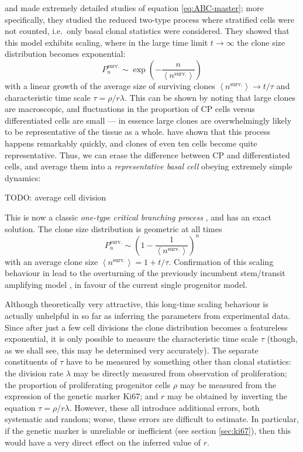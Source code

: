 \documentclass[10pt,english]{report}
\begin{document}
\citet{klein08} and \citet{tediousharvard} made extremely detailed studies of equation \eqref{eq:ABC-master}; more specifically, they studied the reduced two-type process where stratified cells were not counted, i.e.\ only basal clonal statistics were considered. They showed that this model exhibits scaling, where in the large time limit $t\rightarrow\infty$ the clone size distribution becomes exponential: $$P^\textrm{surv.}_n \sim \exp\left(-\frac{n}{\left\langle n^\textrm{surv.} \right\rangle}\right)$$ with a linear growth of the average size of surviving clones $\left\langle n^\textrm{surv.} \right\rangle \rightarrow t/\tau$ and characteristic time scale $\tau = \rho/r\lambda$. This can be shown by noting that large clones are macroscopic, and fluctuations in the proportion of CP cells versus differentiated cells are small --- in essence large clones are overwhelmingly likely to be representative of the tissue as a whole. \citealt{tediousharvard} have shown that this process happens remarkably quickly, and clones of even ten cells become quite representative. Thus, we can erase the difference between CP and differentiated cells, and average them into a \emph{representative basal cell} obeying extremely simple dynamics: 

TODO: average cell division

This is now a classic \emph{one-type critical branching process} \citep{athreya&ney}, and has an exact solution. The clone size distribution is geometric at all times $$P^\textrm{surv.}_n \sim \left(1-\frac{1}{\left\langle n^\textrm{surv.} \right\rangle}\right)^n$$ with an average clone size $\left\langle n^\textrm{surv.} \right\rangle = 1 + t/\tau$. Confirmation of this scaling behaviour in \citet{clayton} lead to the overturning of the previously incumbent stem/transit amplifying model \citep{stemta1,stemta2,stemta3}, in favour of the current single progenitor model.

Although theoretically very attractive, this long-time scaling behaviour is actually unhelpful in so far as inferring the parameters from experimental data. Since after just a few cell divisions the clone distribution becomes a featureless exponential, it is only possible to measure the characteristic time scale $\tau$ (though, as we shall see, this may be determined very accurately). The separate constituents of $\tau$ have to be measured by something other than clonal statistics: the division rate $\lambda$ may be directly measured from observation of proliferation; the proportion of proliferating progenitor cells $\rho$ may be measured from the expression of the genetic marker Ki67; and $r$ may be obtained by inverting the equation $\tau = \rho/r\lambda$. However, these all introduce additional errors, both systematic and random; worse, these errors are difficult to estimate. In particular, if the genetic marker is unreliable or inefficient (see section \ref{sec:ki67}), then this would have a very direct effect on the inferred value of $r$.
\end{document}
